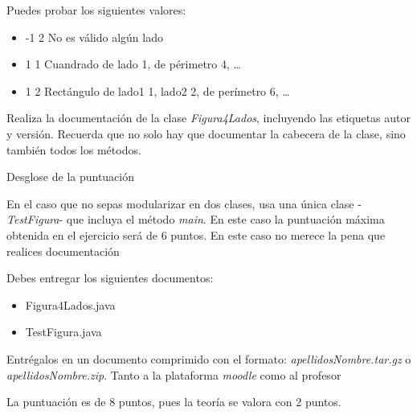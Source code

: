\documentclass[addpoints,12pt]{exam}
\begin{document}
\begin{questions}
\begin{itemize}
\end{itemize}
\newpage
Puedes probar los siguientes valores:
\begin{itemize}
\item -1 2  No es válido algún lado
\item 1 1  Cuandrado de lado 1, de périmetro 4, \dots
\item 1 2  Rectángulo de lado1 1, lado2 2, de perímetro 6, \dots
\end{itemize}
Realiza la documentación de la clase \emph{Figura4Lados}, incluyendo las etiquetas autor y versión. Recuerda que no solo hay que documentar la cabecera de la clase, sino también todos los métodos.\par
\vspace{0.5cm}
Desglose de la puntuación
En el caso que no sepas modularizar en dos clases, usa una única clase -\emph{TestFigura}- que incluya el método \emph{main}. En este caso la puntuación máxima obtenida en el ejercicio será de 6 puntos. En este caso no merece la pena que realices documentación
\end{questions}

\vspace{0,5cm}
Debes entregar los siguientes documentos:
\begin{itemize}
\item Figura4Lados.java
\item TestFigura.java
\end{itemize}

Entrégalos en un documento comprimido con el formato:\emph{ apellidosNombre.tar.gz} o \emph{apellidosNombre.zip}. Tanto a la plataforma \emph{moodle} como al profesor\par
\vspace{0.5cm}
La puntuación es de 8 puntos, pues la teoría se valora con 2 puntos.
\end{document}
